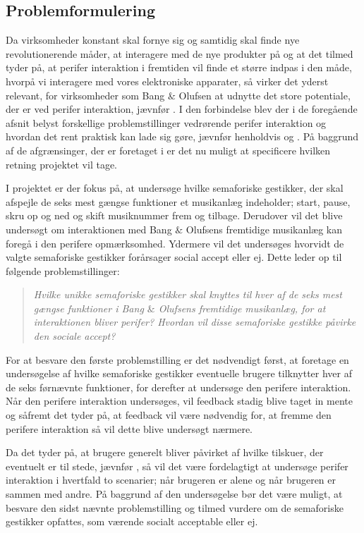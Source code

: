 \subsection{Problemformulering}
\label{Problemformulering}
%
Da virksomheder konstant skal fornye sig og samtidig skal finde nye revolutionerende måder, at interagere med de nye produkter på og at det tilmed tyder på, at perifer interaktion i fremtiden vil finde et større indpas i den måde, hvorpå vi interagere med vores elektroniske apparater, så virker det yderst relevant, for virksomheder som Bang $\&$ Olufsen at udnytte det store potentiale, der er ved perifer interaktion, jævnfør . I den forbindelse blev der i de foregående afsnit belyst forskellige problemstillinger vedrørende perifer interaktion og hvordan det rent praktisk kan lade sig gøre, jævnfør henholdvis  og . På baggrund af de afgrænsinger, der er foretaget i  er det nu muligt at specificere hvilken retning projektet vil tage.  

I projektet er der fokus på, at undersøge hvilke semaforiske gestikker, der skal afspejle de seks mest gængse funktioner et musikanlæg indeholder; start, pause, skru op og ned og skift musiknummer frem og tilbage. Derudover vil det blive undersøgt om interaktionen med Bang $\&$ Olufsens fremtidige musikanlæg kan foregå i den perifere opmærksomhed. Ydermere vil det undersøges hvorvidt de valgte semaforiske gestikker forårsager social accept eller ej. Dette leder op til følgende problemstillinger:\blankline
%
\begin{quotation}
\noindent
\textit{Hvilke unikke semaforiske gestikker skal knyttes til hver af de seks mest gængse funktioner i Bang $\&$ Olufsens fremtidige musikanlæg, for at interaktionen bliver perifer?\blankline
%
Hvordan vil disse semaforiske gestikke påvirke den sociale accept?}\blankline
\end{quotation}
%
For at besvare den første problemstilling er det nødvendigt først, at foretage en undersøgelse af hvilke semaforiske gestikker eventuelle brugere tilknytter hver af de seks førnævnte funktioner, for derefter at undersøge den perifere interaktion. Når den perifere interaktion undersøges, vil feedback stadig blive taget in mente og såfremt det tyder på, at feedback vil være nødvendig for, at fremme den perifere interaktion så vil dette blive undersøgt nærmere.   

Da det tyder på, at brugere generelt bliver påvirket af hvilke tilskuer, der eventuelt er til stede, jævnfør , så vil det være fordelagtigt at undersøge perifer interaktion i hvertfald to scenarier; når brugeren er alene og når brugeren er sammen med andre. På baggrund af den undersøgelse bør det være muligt, at besvare den sidst nævnte problemstilling og tilmed vurdere om de semaforiske gestikker opfattes, som værende socialt acceptable eller ej. 



